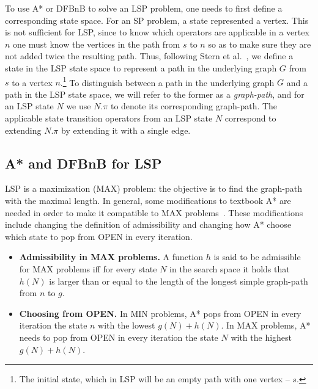 \documentclass[letterpaper]{article} %
\newcommand\Roni[1]{\nb{\textbf{Roni:}}{blue}{#1}}
\begin{document}
To use A* or DFBnB to solve an LSP problem, one needs to first define a corresponding state space. For an SP problem, a state represented a vertex. This is not sufficient for LSP, since to know which operators are applicable in a vertex $n$ one must know the vertices in the path from $s$ to $n$ so as to make sure they are not added twice the resulting path. 
Thus, 
following Stern et al.~, we define a state in the LSP state space to represent a path in the underlying graph $G$ from $s$ to a vertex $n$.\footnote{The initial state, which in LSP will be an empty path with one vertex -- $s$.} 
To distinguish between a path in the underlying graph $G$ and a path in the LSP state space,  we will refer to the former as a \emph{graph-path}, and for an LSP state $N$ 
we use $N.\pi$ to denote its corresponding graph-path. 
The applicable state transition operators from an LSP state $N$ correspond to extending 
$N.\pi$ by extending it with a single edge. 


\subsection{A* and DFBnB for LSP}
LSP is a maximization (MAX) problem: the objective is to find the graph-path with the  maximal length. In general, some modifications to textbook A* are needed in order to make it compatible to MAX problems~\cite{DBLP:conf/socs/SternKPFR14}. These modifications include changing the definition of admissibility and changing how A* choose which state to pop from OPEN in every iteration. 
\begin{itemize}
    \item \textbf{Admissibility in MAX problems.} A function $h$ is said to be admissible for MAX problems iff for every state $N$ in the search space it holds that $h(N)$ is larger than or equal to the length of the longest simple graph-path from $n$ to $g$. 
    \item \textbf{Choosing from OPEN.} In MIN problems, A* pops from OPEN in every iteration the state $n$ with the lowest $g(N)+h(N)$. In MAX problems, A* needs to pop from OPEN in every iteration the state $N$ with the highest $g(N)+h(N)$. 
\end{itemize}
\end{document}

